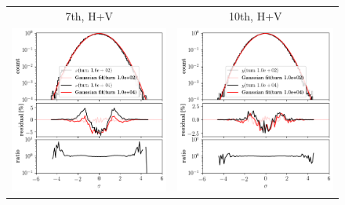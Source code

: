 \documentclass[aps
,prstab
,reprint
,longbibliography
,preprintnumbers
,showkeys
,amsfonts,amssymb,amsmath
,floatfix
]{revtex4-1}
\newlength{\bsrtwidth}
\begin{document}
\begin{figure}
\begin{tabular}{cc}
    7th, H+V & 10th, H+V \\
    \includegraphics[width=\bsrtwidth]{2016injerra2b2u_t7skhv_3_5um_hist_x.png}
                  &
    \includegraphics[width=\bsrtwidth]{2016injerra2b2u_t10skhv_3_5um_hist_y.png} \\

\end{tabular}
\end{figure}
\end{document}
